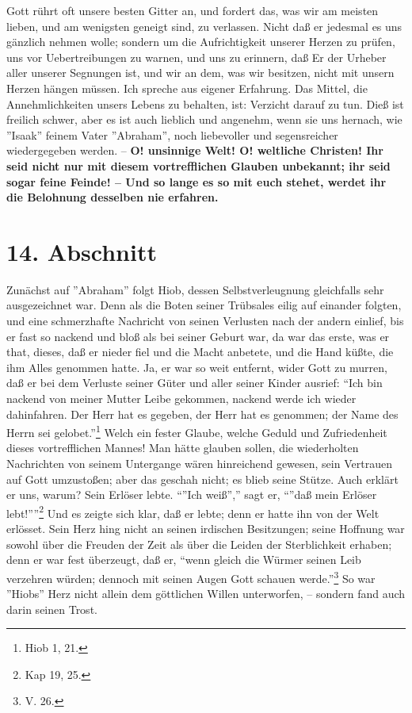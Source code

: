 \medskip

Gott rührt oft unsere besten Gitter an, und fordert das, was wir am meisten
lieben, und am wenigsten geneigt sind, zu verlassen. Nicht daß er jedesmal es
uns gänzlich nehmen wolle; sondern um die Aufrichtigkeit unserer Herzen zu
prüfen, uns vor Uebertreibungen zu warnen, und uns zu erinnern, daß Er der
Urheber aller unserer Segnungen ist, und wir an dem, was wir besitzen, nicht mit
unsern Herzen hängen müssen. Ich spreche aus eigener Erfahrung. Das Mittel, die
Annehmlichkeiten unsers Lebens zu behalten, ist: Verzicht darauf zu tun. Dieß
ist freilich schwer, aber es ist auch lieblich und angenehm, wenn sie uns
hernach, wie ''Isaak'' feinem Vater ''Abraham'', noch liebevoller und
segensreicher wiedergegeben werden. -- \textbf{O! unsinnige Welt! O! weltliche Christen!
Ihr seid nicht nur mit diesem vortrefflichen Glauben unbekannt; ihr seid sogar
feine Feinde! -- Und so lange es so mit euch stehet, werdet ihr die Belohnung
desselben nie erfahren.}

\section{14. Abschnitt} \label{kap4_ab14}

Zunächst auf ''Abraham'' folgt Hiob, dessen Selbstverleugnung gleichfalls sehr
ausgezeichnet war. Denn als die Boten seiner Trübsales eilig auf einander
folgten, und eine schmerzhafte Nachricht von seinen Verlusten nach der andern
einlief, bis er fast so nackend und bloß als bei seiner Geburt war, da war das
erste, was er that, dieses, daß er nieder fiel und die Macht anbetete, und die
Hand küßte, die ihm Alles genommen hatte. Ja, er war so weit entfernt, wider
Gott zu murren, daß er bei dem Verluste seiner Güter und aller seiner Kinder
ausrief: "`Ich bin nackend von meiner Mutter Leibe gekommen, nackend werde ich
wieder dahinfahren. Der Herr hat es gegeben, der Herr hat es genommen; der Name
des Herrn sei gelobet."'\footnote{Hiob 1, 21.} Welch ein fester Glaube, welche
Geduld und Zufriedenheit dieses vortrefflichen Mannes! Man hätte glauben sollen,
die wiederholten Nachrichten von seinem Untergange wären hinreichend gewesen,
sein Vertrauen auf Gott umzustoßen; aber das geschah nicht; es blieb seine
Stütze. Auch erklärt er uns, warum? Sein Erlöser lebte. "`''Ich weiß'',"' sagt
er, "`''daß mein Erlöser lebt!''"'\footnote{Kap 19, 25.} Und es zeigte sich
klar, daß er lebte; denn er hatte ihn von der Welt erlösset. Sein Herz hing
nicht an seinen irdischen Besitzungen; seine Hoffnung war sowohl über die
Freuden der Zeit als über die Leiden der Sterblichkeit erhaben; denn er war fest
überzeugt, daß er, "`wenn gleich die Würmer seinen Leib verzehren würden;
dennoch mit seinen Augen Gott schauen werde."'\footnote{V. 26.} So war ''Hiobs''
Herz nicht allein dem göttlichen Willen unterworfen, – sondern fand auch darin
seinen Trost.

